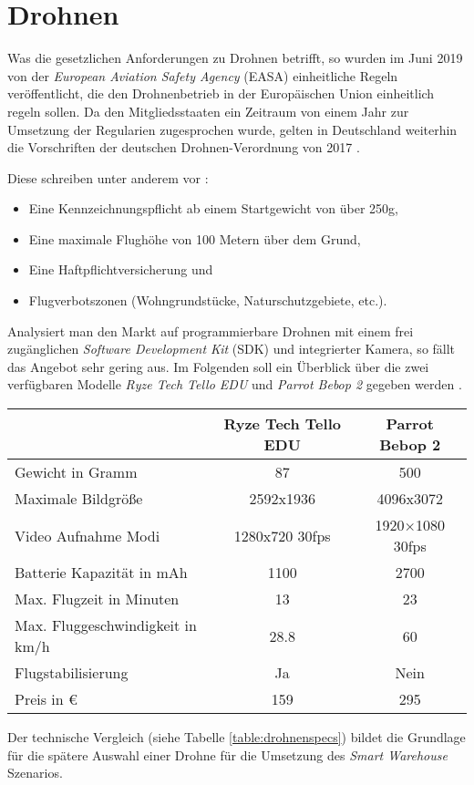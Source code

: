 \section{Drohnen} \label{drohnen}

Was die gesetzlichen Anforderungen zu Drohnen betrifft, so wurden im Juni 2019 von der \textit{European Aviation Safety Agency} (EASA) einheitliche Regeln veröffentlicht, die den Drohnenbetrieb in der Europäischen Union einheitlich regeln sollen. Da den Mitgliedsstaaten ein Zeitraum von einem Jahr zur Umsetzung der Regularien zugesprochen wurde, gelten in Deutschland weiterhin die Vorschriften der deutschen Drohnen-Verordnung von 2017 \cite{EASA.2019}.

Diese schreiben unter anderem vor \cite{Drohnen.de.2020}:
\begin{itemize}
	\item Eine Kennzeichnungspflicht ab einem Startgewicht von über 250g,
	\item Eine maximale Flughöhe von 100 Metern über dem Grund,
	\item Eine Haftpflichtversicherung und
	\item Flugverbotszonen (Wohngrundstücke, Naturschutzgebiete, etc.).
\end{itemize}

Analysiert man den Markt auf programmierbare Drohnen mit einem frei zugänglichen \textit{Software Development Kit} (SDK) und integrierter Kamera, so fällt das Angebot sehr gering aus. Im Folgenden soll ein Überblick über die zwei verfügbaren Modelle \textit{Ryze Tech Tello EDU} und \textit{Parrot Bebop 2} gegeben werden \cite{RyzeRobotics.2020, Parrot.20200520}.

\begin{center}
	\begin{tabular}[H]{l|c|c}
		& Ryze Tech Tello EDU & Parrot Bebop 2\\
		\hline
		Gewicht in Gramm & 87 & 500 \\
		Maximale Bildgröße & 2592x1936 & 4096x3072 \\
		Video Aufnahme Modi & 1280x720 30fps & 1920×1080 30fps \\
		Batterie Kapazität in mAh & 1100 & 2700 \\
		Max. Flugzeit in Minuten & 13 & 23 \\
		Max. Fluggeschwindigkeit in km/h & 28.8 & 60 \\
		Flugstabilisierung & Ja & Nein \\
		Preis in € & 159 & 295
	\end{tabular}
	\label{table:drohnenspecs}
\end{center}

Der technische Vergleich (siehe Tabelle \ref{table:drohnenspecs}) bildet die Grundlage für die spätere Auswahl einer Drohne für die Umsetzung des \textit{Smart Warehouse} Szenarios.